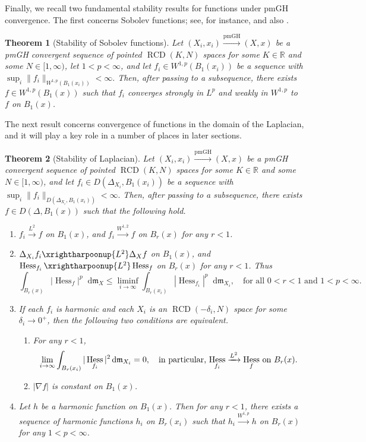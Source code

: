 \documentclass[11pt,reqno]{amsart}
\newtheorem{theorem}{Theorem}[section]
\theoremstyle{definition}
\numberwithin{equation}{section}
\newcommand{\di}{\mathop{}\!\mathrm{d}}
\newcommand{\meas}{\mathfrak{m}}
\DeclareMathOperator{\Hess}{Hess}
\DeclareMathOperator{\RCD}{RCD}
\begin{document}
Finally, we recall two fundamental stability results for functions under pmGH convergence. The first concerns Sobolev functions; see, for instance, \cite[Theorem 4.6]{AmbrosioHonda2} and also \cite{Honda2, NVg}.
\begin{theorem}[Stability of Sobolev functions]\label{stabsob}
    Let $(X_i, x_i) \xrightarrow{\mathrm{pmGH}} (X, x)$
 be a pmGH convergent sequence of pointed $\RCD(K, N)$ spaces for some $K \in \mathbb{R}$ and some $N \in [1, \infty)$, let $1<p<\infty$, and let $f_i \in W^{1,p}(B_1(x_i))$ be a sequence with
$
\sup_i\|f_i\|_{W^{1,p}(B_1(x_i))}<\infty.
$
Then, after passing to a subsequence, there exists $f \in W^{1,p}(B_1(x))$ such that  $f_i$ converges strongly in $L^p$  and weakly in $W^{1,p}$ to $f$ on $B_1(x)$. 
\end{theorem}
The next result concerns convergence   of functions in the domain of the Laplacian, and it will play a key role in a number of places in later sections.
\begin{theorem}[Stability of Laplacian]\label{hessconv}
Let
$
    (X_i, x_i) \xrightarrow{\mathrm{pmGH}}  (X, x)
$
 be a pmGH convergent sequence of pointed $\RCD(K, N)$ spaces for some $K \in \mathbb{R}$ and some $N \in [1, \infty)$, and let $f_i \in D(\Delta_{X_i}, B_1(x_i))$ be a sequence with
$
\sup_i\|f_i\|_{D(\Delta_{X_i}, B_1(x_i))}<\infty.
$
Then, after passing to a subsequence, there exists $f \in D(\Delta, B_1(x))$ such that the following hold.
 \begin{enumerate}
     \item $f_i\xrightarrow{L^2}f$ on $B_1( x )$, and $f_i\xrightarrow{W^{1,2}}f$ on $B_r( x )$ for any $r<1$. 
     \item $\Delta_{X_i} f_i    \xrightharpoonup{L^2} \Delta_X f$ on $B_1(x)$, and 
     $\Hess_{f_i} \xrightharpoonup{L^2} \Hess_f$ on $B_r(x)$ for any $r<1$. Thus 
     \begin{equation}\label{hessss}
       \int_{B_r(x)}|\Hess_f|^{p } \di \meas_X  \leq \liminf_{i\to \infty}\int_{B_r(x_i)}|\Hess_{f_i}|^{p} \di \meas_{X_i} ,\quad  \text{for all $0<r < 1$ and $1<p<\infty$.}
     \end{equation}
\item If each $f_i$ is harmonic and each $X_i$ is an $\RCD(-\delta_i, N)$ space for some $\delta_i \to 0^+$, then the following two conditions are equivalent.
\begin{enumerate}
\item For any $r<1$,
\begin{equation}\label{999s}
\lim_{i\to\infty}\int_{B_r(x_i)}|\Hess_{f_i}|^2\di \meas_{X_i}=0, \quad \text{in particular, $ \Hess_{f_i} \xrightarrow{L^2} \Hess_f$ on $B_r(x)$.}
\end{equation}
\item $|\nabla f|$ is constant on $B_1(x)$. 
\end{enumerate}
\item Let $h$ be a harmonic function on $B_1(x)$. Then for any $r<1$,  there exists a sequence of harmonic functions $h_i$ on $B_r(x_i)$ such that $h_i \xrightarrow{W^{1, p}} h$ on $B_r(x)$ for any $1 < p<\infty$.
 \end{enumerate}
\end{theorem}
 
\end{document}
